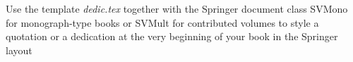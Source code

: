 %
%
%

\begin{dedication}
Use the template \emph{dedic.tex} together with the Springer document class SVMono for monograph-type books or SVMult for contributed volumes to style a quotation or a dedication at the very beginning of your book in the Springer layout
\end{dedication}



